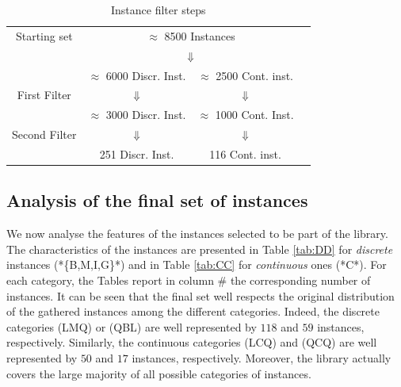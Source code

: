 \begin{center}
\begin{table}[]
 \centering
 \setlength{\tabcolsep}{5pt}
\begin{tabular}{cccc}
Starting set& \multicolumn{ 2}{c}{ $\approx$ 8500 Instances }& \\
& \multicolumn{ 2}{c}{$\Downarrow$}& \\
& $\approx$ 6000 Discr. Inst.  & $\approx$ 2500 Cont. inst. & \\
First Filter  & $\Downarrow$  & $\Downarrow$ & \\
 & $\approx$ 3000 Discr. Inst.  & $\approx$ 1000 Cont. Inst. & \\
Second Filter & $\Downarrow$  & $\Downarrow$  & \\
  & 251 Discr. Inst.  & 116  Cont. inst. & \\
\end{tabular}
\caption{Instance filter steps} \label{tab:filters}
\end{table}
\end{center}

\subsection{Analysis of the final set of instances}\label{subsec:final set}

We now analyse the features of the instances selected to be part of the
library. The characteristics of the instances are presented in Table
\ref{tab:DD} for \emph{discrete} instances (*\{B,M,I,G\}*) and in Table
\ref{tab:CC} for \emph{continuous} ones (*C*). For each category, the Tables
report in column $\#$ the corresponding number of instances. It can be seen
that the final set well respects the original distribution of the gathered
instances among the different categories. Indeed, the discrete categories
(LMQ) or (QBL) are well represented by $118$ and $59$ instances,
respectively. Similarly, the continuous categories (LCQ) and (QCQ) are well
represented by $50$ and $17$ instances, respectively. Moreover, the library
actually covers the large majority of all possible categories of instances.

